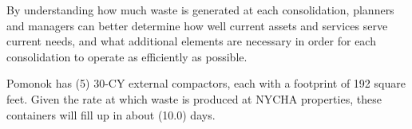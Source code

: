
    By understanding how much waste is generated at each consolidation, planners and managers
    can better determine how well current assets and services serve current needs, and what additional 
    elements are necessary in order for each consolidation to operate as efficiently as possible. 

    Pomonok has (5) 30-CY external compactors, each with a footprint of 192 square feet. Given the rate at which waste is produced at NYCHA properties, these containers will fill
    up in about (10.0) days.